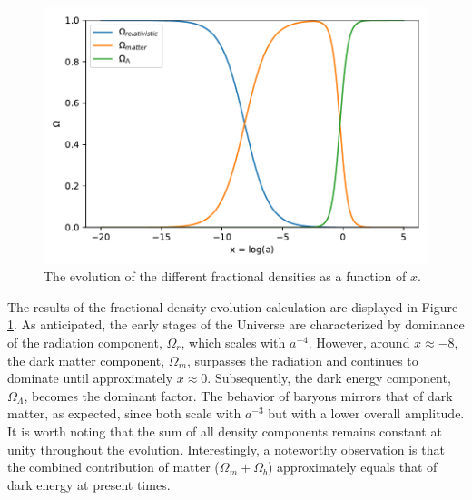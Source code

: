 \documentclass{aa}
\begin{document}
\begin{figure}[h!]
   \includegraphics[scale=0.5]{Figures/milestone_1/densities.pdf}
   \caption{The evolution of the different fractional densities as a
    function of $x$.}\label{fig:M1_densities}
\end{figure}
The results of the fractional density evolution calculation are displayed in Figure \ref{fig:M1_densities}. As anticipated, the early stages of the Universe are characterized by dominance of the radiation component, $\Omega_r$, which scales with $a^{-4}$. However, around $x \approx -8$, the dark matter component, $\Omega_m$, surpasses the radiation and continues to dominate until approximately $x \approx 0$. Subsequently, the dark energy component, $\Omega_\Lambda$, becomes the dominant factor. The behavior of baryons mirrors that of dark matter, as expected, since both scale with $a^{-3}$ but with a lower overall amplitude. It is worth noting that the sum of all density components remains constant at unity throughout the evolution. Interestingly, a noteworthy observation is that the combined contribution of matter ($\Omega_m + \Omega_b$) approximately equals that of dark energy at present times.
\end{document}
